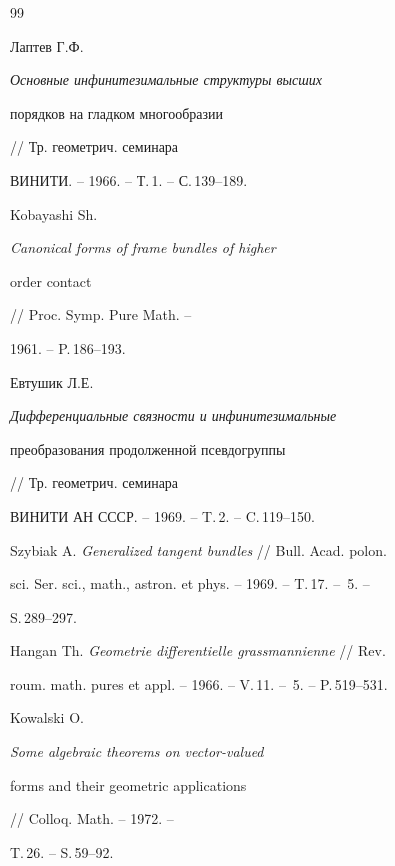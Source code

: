 \begin{thebibliography}{99}







Лаптев Г.Ф. {\em Основные инфинитезимальные структуры высших


порядков на гладком многообразии} // Тр. геометрич. семинара


ВИНИТИ. -- 1966. -- Т.\,1. -- С.\,139--189.







Kobayashi Sh. {\em Canonical forms of frame bundles of higher


order contact} // Proc. Symp. Pure Math. -- 


1961. -- P.\,186--193.







Евтушик Л.Е. {\em Дифференциальные связности и инфинитезимальные


преобразования продолженной псевдогруппы} // Тр. геометрич. семинара


ВИНИТИ АН СССР. -- 1969. -- T.\,2. -- C.\,119--150.







Szybiak A. {\em Generalized tangent bundles} // Bull. Acad. polon.


sci. Ser. sci., math., astron. et phys. -- 1969. -- T.\,17. -- \No\,5. --


S.\,289--297.







Hangan Th. {\em Geometrie differentielle grassmannienne} // Rev.


roum. math. pures et appl. -- 1966. -- V.\,11. -- \No\,5. -- P.\,519--531.







Kowalski O. {\em Some algebraic theorems on vector-valued


forms and their geometric applications} // Colloq. Math. -- 1972. --


T.\,26. -- S.\,59--92.






\end{thebibliography}

